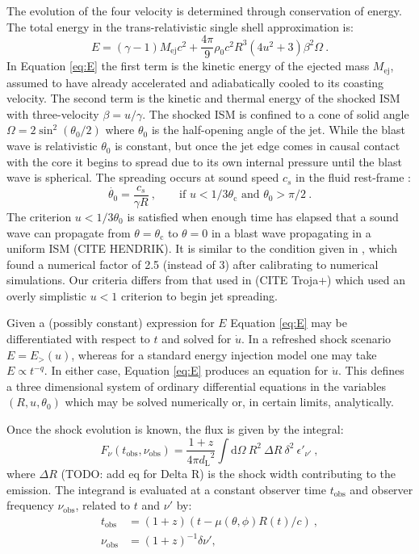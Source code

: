 \documentclass[twocolumn]{aastex62}
\newcommand{\dd}{\ensuremath{\mathrm{d}}}
\newcommand{\Mej}{\ensuremath{M_{\mathrm{ej}}}}
\newcommand{\tobs}{\ensuremath{t_{\mathrm{obs}}}}
\newcommand{\nuobs}{\ensuremath{\nu_{\mathrm{obs}}}}
\newcommand{\thC}{\ensuremath{\theta_{\mathrm{c}}}}
\newcommand{\dL}{\ensuremath{d_{\mathrm{L}}}}
\begin{document}
 The evolution of the four velocity is determined through conservation of energy.  The total energy in the trans-relativistic single shell approximation is:
\begin{equation}
	E = (\gamma - 1)\Mej c^2 + \frac{4\pi}{9} \rho_0 c^2 R^3 (4 u^2 + 3) \beta^2 \Omega\ . \label{eq:E}
\end{equation}
In Equation \eqref{eq:E} the first term is the kinetic energy of the ejected mass $\Mej$, assumed to have already accelerated and adiabatically cooled to its coasting velocity. The second term is the kinetic and thermal energy of the shocked ISM with three-velocity $\beta = u / \gamma$. The shocked ISM is confined to a cone of solid angle $\Omega = 2 \sin^2 (\theta_0/2)$ where $\theta_0$ is the half-opening angle of the jet. While the blast wave is relativistic $\theta_0$ is constant, but once the jet edge comes in causal contact with the core it begins to spread due to its own internal pressure until the blast wave is spherical.  The spreading occurs at sound speed $c_s$ in the fluid rest-frame \citep{van-Eerten:2010aa, Duffell:2018aa}:
\begin{equation}
	\dot{\theta_0} = \frac{c_s}{\gamma R}\ , \qquad \text{if } u < 1/3\thC \text{ and } \theta_0 > \pi/2\ . \label{eq:thetadot}
\end{equation}
The criterion $u < 1/3\theta_0$ is satisfied when enough time has elapsed that a sound wave can propagate from $\theta = \thC$ to $\theta=0$ in a blast wave propagating in a uniform ISM (CITE HENDRIK).  It is similar to the condition given in \cite{Duffell:2018aa}, which found a numerical factor of 2.5 (instead of 3) after calibrating to numerical simulations.  Our criteria differs from that used in (CITE Troja+) which used an overly simplistic $u < 1$ criterion to begin jet spreading.

Given a (possibly constant) expression for $E$ Equation \eqref{eq:E} may be differentiated with respect to $t$ and solved for $\dot{u}$.  In a refreshed shock scenario $E = E_{>}(u)$, whereas for a standard energy injection model one may take $E \propto t^{-q}$.  In either case, Equation \eqref{eq:E} produces an equation for $\dot{u}$.  This defines a three dimensional system of ordinary differential equations in the variables $(R, u, \theta_0)$ which may be solved numerically or, in certain limits, analytically.

Once the shock evolution is known, the flux is given by the integral:
\begin{equation}
	F_\nu(\tobs, \nuobs) = \frac{1+z}{4\pi \dL^2} \int \! \dd \Omega\ R^2\ \Delta R\  \delta^2\ \epsilon'_{\nu'} \ , \label{eq:flux2}
\end{equation}
where $\Delta R$ (TODO: add eq for Delta R) is the shock width contributing to the emission. The integrand is evaluated at a constant observer time $\tobs$ and observer frequency $\nuobs$, related to $t$ and $\nu'$ by:
\begin{align}
	\tobs &= (1+z) \left(t - \mu(\theta, \phi) R(t)/c\right)\ , \label{eq:tobs} \\
	\nuobs &= (1+z)^{-1} \delta \nu' , \label{eq:nuobs}
\end{align}
\end{document}
